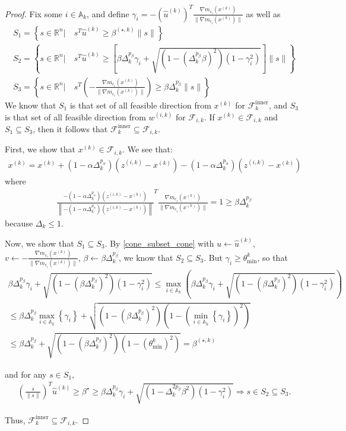 \documentclass{article}
\theoremstyle{case}
\newcommand{\xk}{{x^{(k)}}}
\newcommand{\Rn}{\mathbb R^n}
\newcommand{\dk}{\Delta_k}
\newcommand{\zik}{{z^{(i, k)}}}
\newcommand{\fik}{{\mathcal F_{i, k}}}
\newcommand{\huk}{{{\hat u}^{(k)}}}
\newcommand{\bsk}{{\beta^{(\star, k)}}}
\newcommand{\fcki}{{\mathcal {F}^{\text{inner}}_k}}
\newcommand{\wik}{{w^{(i, k)}}}
\newcommand{\gmcik}{{\nabla m_{c_i}^{(k)}(\xk)}}
\newcommand{\hgik}{{\frac{\nabla m_{c_i}(\xk)}{\|\nabla m_{c_i}(\xk)\|}}}
\newcommand{\activeconstraintsk}{{\mathbb A_{k}}}
\newcommand{\thetamink}{{\theta^k_{\text{min}}}}
\begin{document}
\begin{proof}
Fix some $i \in \activeconstraintsk$, and define $\gamma_i = -\left(\huk\right)^T\hgik$ as well as
\begin{align*}
S_1 = \left\{s\in\Rn | \quad s^T\huk\ge\bsk\|s\| \right\} \\
S_2 = \left\{s\in\Rn | \quad s^T\huk\ge\left[\beta\dk^{p_{\beta}}\gamma_i + \sqrt{(1 - \left(\dk^{p_{\beta}}\beta\right)^2)\left(1 - \gamma_i^2\right)}\right]\|s\| \right\} \\
S_3 = \left\{s\in\Rn | \quad s^T\left(-\hgik\right)\ge\beta\dk^{p_{\beta}}\|s\| \right\}
\end{align*}
We know that $S_1$ is that set of all feasible direction from $\xk$ for $\fcki$, and $S_3$ is that set of all feasible direction from $\wik$ for $\fik$.
If $\xk \in \fik$ and $S_1 \subseteq S_3$, then it follows that $\fcki \subseteq \fik$.

First, we show that $\xk \in \fik$.
We see that:
\begin{align*}
\xk = \xk + \left(1 - \alpha\dk^{p_{\alpha} }\right)(\zik - \xk) - \left(1 - \alpha\dk^{p_{\alpha} }\right)(\zik - \xk)
\end{align*}
where
\begin{align*}
\frac{-\left(1 - \alpha\dk^{p_{\alpha} }\right)(\zik - \xk)}{\left\|-\left(1 - \alpha\dk^{p_{\alpha} }\right)(\zik - \xk)\right\|}^T\hgik = 1 \ge \beta \dk^{p_{\beta}}
\end{align*}
because $\dk \le 1$.

Now, we show that $S_1 \subseteq S_3$.
By \cref{cone_subset_cone} with $u \gets \huk$, $v \gets -\hgik$, $\beta \gets \beta \dk^{p_{\beta}}$, we know that
$S_2 \subseteq S_3$.
But $\gamma_i \ge \thetamink$, so that
\begin{align*}
\beta\dk^{p_{\beta}}\gamma_i + \sqrt{\left(1 - \left(\beta\dk^{p_{\beta}}\right)^2\right)\left(1 - \gamma_i^2\right)}
\le \max_{i\in\activeconstraintsk} \left(\beta\dk^{p_{\beta}}\gamma_i + \sqrt{\left(1 - \left(\beta\dk^{p_{\beta}}\right)^2\right)\left(1 - \gamma_i^2\right)}\right) \\
\le \beta\dk^{p_{\beta}} \max_{i\in\activeconstraintsk}\left\{\gamma_i\right\} + \sqrt{\left(1 - \left(\beta\dk^{p_{\beta}}\right)^2\right)\left(1 - \left(\min_{i\in\activeconstraintsk}\left\{\gamma_i\right\}\right)^2\right)} \\
\le \beta\dk^{p_{\beta}} + \sqrt{\left(1 - \left(\beta\dk^{p_{\beta}}\right)^2\right)\left(1 - \left(\thetamink\right)^2\right)} = \bsk
\end{align*}

and for any $s\in S_1$,
\begin{align*}
\left(\frac{s}{\|s\|}\right)^T\huk \ge \beta^{\star} 
\ge \beta\dk^{p_{\beta}}\gamma_i + \sqrt{(1 - \dk^{2p_{\beta}}\beta^2)\left(1 - \gamma_i^2\right)}
\Longrightarrow s \in S_2 \subseteq S_3.
\end{align*}

Thus, $\fcki \subseteq \fik$.
\end{proof}
\end{document}
